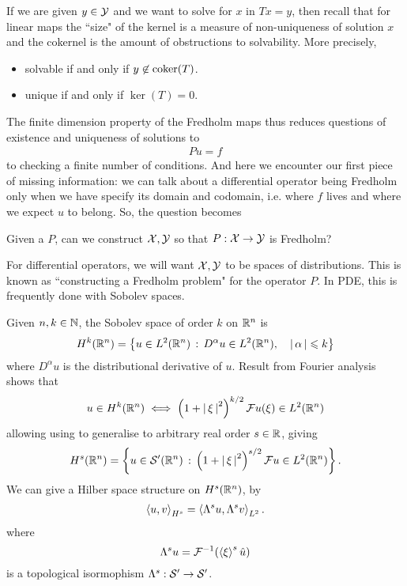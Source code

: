 \documentclass{article}
\begin{document}
If we are given $y \in \Y$ and we want to solve for $x$ in $Tx = y$, then recall that for linear maps the ``size" of the kernel is a measure of non-uniqueness of solution $x$ and the cokernel is the amount of obstructions to solvability. More precisely, 
\begin{itemize}
    \item solvable if and only if  $y \not \in \coker(T)$. 
    \item unique if and only if $\ker(T) = 0$. 
\end{itemize}
The finite dimension property of the Fredholm maps thus reduces questions of existence and uniqueness of solutions to 
\begin{align*}
Pu = f
\end{align*}
to checking a finite number of conditions. And here we encounter our first piece of missing information: we can talk about a differential operator being Fredholm only when we have specify its domain and codomain, i.e. where $f$ lives and where we expect $u$ to belong. So, the question becomes
\begin{center}
    Given a $P$, can we construct $\X, \Y$ so that $P : \X \to \Y$ is Fredholm? 
\end{center}
For differential operators, we will want $\X, \Y$ to be spaces of distributions. This is known as ``constructing a Fredholm problem" for the operator $P$. In PDE, this is  frequently done with Sobolev spaces. 
\begin{fdefinition}
    Given  $n, k \in \N$, the Sobolev space of order $k$ on $\R^n$ is 
    \begin{align*}
    H^k(\R^n) = \set{u \in L^2(\R^n) \wh D^\alpha u \in L^2(\R^n), \quad \abs{\alpha} \leq k}
    \end{align*}
    where $D^\alpha u $ is the distributional  derivative of $u$. Result from Fourier analysis shows that 
    \begin{align*}
    u \in H^k(\R^n) \iff \brac{1 + \abs{\xi}^2}^{k/2} \F u(\xi) \in L^2(\R^n)
    \end{align*}
    allowing using to generalise to arbitrary real order $s \in \R$, giving
    \begin{align*}
    H^s(\R^n) = \set{u \in \sch'(\R^n) \wh \brac{ 1 + \abs{\xi}^2}^{s/2} \F u \in L^2(\R^n)}. 
    \end{align*}
    We can give a Hilber space structure on $H^s(\R^n)$, by 
    \begin{align*}
    \inprod[u, v]_{H^s} = \inprod[ \Lambda^s u, \Lambda^sv]_{L^2}. 
    \end{align*}
    where $$\Lambda^su = \F^{-1}(\abrac{\xi}^s \hat{u})$$ is a topological isormophism $\Lambda^s : \sch' \to \sch'$. 
\end{fdefinition}
\end{document}
